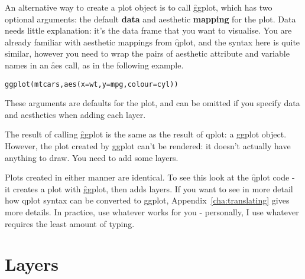 
An alternative way to create a plot object is to call \f{ggplot}, which has two optional arguments: the default {\bf data} and aesthetic {\bf mapping} for the plot.  Data needs little explanation: it's the data frame that you want to visualise.  You are already familiar with aesthetic mappings from \f{qplot}, and the syntax here is quite similar, however you need to wrap the pairs of aesthetic attribute and variable names in an \f{aes} call, as in the following example.

\begin{alltt}
ggplot(mtcars, aes(x = wt, y = mpg, colour = cyl))
\end{alltt}

These arguments are defaults for the plot, and can be omitted if you specify data and aesthetics when adding each layer.  

The result of calling \f{ggplot} is the same as the result of qplot: a ggplot object.  However, the plot created by ggplot can't be rendered: it doesn't actually have anything to draw.  You need to add some layers.

Plots created in either manner are identical.  To see this look at the \f{qplot} code - it creates a plot with \f{ggplot}, then adds layers.  If you want to see in more detail how qplot syntax can be converted to ggplot, Appendix~\ref{cha:translating} gives more details. In practice, use whatever works for you - personally, I use whatever requires the least amount of typing.

% 

\section{Layers}
\label{sec:layers}

